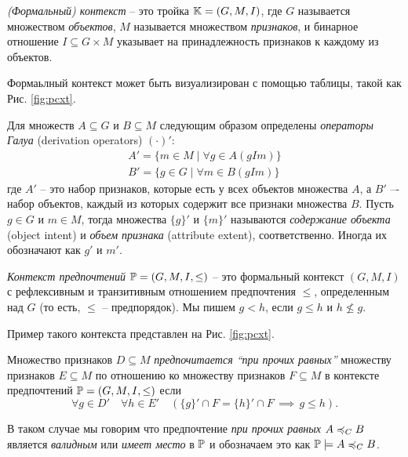 		
		\begin{definition}
		\label{def:context}
			\emph{(Формальный) контекст} – это тройка $\mathbb{K} = (G, M, I)$, где $G$ называется множеством \emph{объектов}, $M$ называется множеством \emph{признаков}, и бинарное отношение ${I \subseteq G \times M}$ указывает на принадлежность признаков к каждому из объектов.
		\end{definition}
		
		Формаьлный контекст может быть визуализирован с помощью таблицы, такой как Рис. \ref{fig:pcxt}.
		
		Для множеств $A \subseteq G$ и $B \subseteq M$ следующим образом определены \emph{операторы Галуа} (derivation operators) $(\cdot)'$:
		\begin{subequations}
			\begin{gather}
			\label{eq:object_intent}
			A'=\{m \in M \mid \forall g \in A (g I m)\}  \\ 
			\label{eq:attribute_extent}
			B'=\{g \in G \mid \forall m \in B (g I m)\}
			\end{gather}
		\end{subequations}
		где $A'$ – это набор признаков, которые есть у всех объектов множества $A$, а $B'$  –- набор объектов, каждый из которых содержит все признаки множества $B$. Пусть $g \in G$ и $m \in M$, тогда множества $\{g\}'$ и $\{m\}'$ называются \emph{содержание объекта} (object intent) и \emph{объем признака} (attribute extent), соответственно. Иногда их обозначают как $g'$ и $m'$.
		
		\begin{definition}
		\label{def:preference_context}
			\emph{Контекст предпочтений} $\mathbb{P} = (G, M, I, \leq)$ – это формальный контекст $(G, M, I)$ с рефлексивным и транзитивным отношением предпочтения $\leq$, определенным над $G$ (то есть, $\leq$ – предпорядок). Мы пишем $g < h$, если $g \leq h$ и $h \not\leq g$.
		\end{definition}
		
		Пример такого контекста представлен на Рис. \ref{fig:pcxt}.
		
		\begin{definition}
		\label{def:ceteris_paribus}
			Множество признаков $D \subseteq M$ \emph{предпочитается \enquote{при прочих равных}} множеству признаков $E \subseteq M$ по отношению ко множеству признаков $F \subseteq M$ в контексте предпочтений $\mathbb{P} = (G, M, I, \leq)$ если 
			\begin{equation}
			\forall g \in D' \quad \forall h \in E' \quad (\{g\}' \cap F = \{h\}' \cap F \, \implies \, g \leq h).
			\end{equation}
			
			В таком случае мы говорим что предпочтение \emph{при прочих равных} $A \preccurlyeq_{C} B$ является \emph{валидным} или \emph{имеет место} в $\mathbb{P}$ и обозначаем это как $\mathbb{P} \models A \preccurlyeq_{C} B$.
		\end{definition}
	
